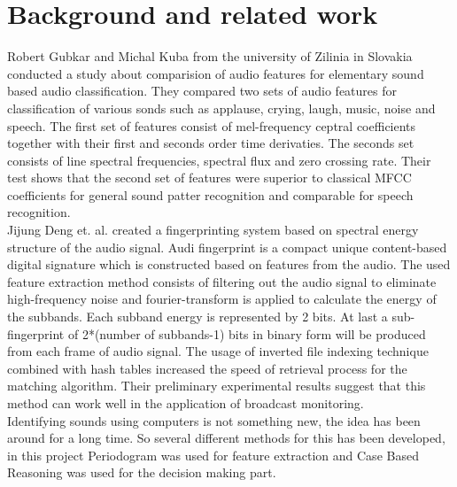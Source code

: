 \section{Background and related work}
Robert Gubkar and Michal Kuba \cite{6566278}  from the university of Zilinia in Slovakia
conducted a study about comparision of audio features for elementary sound
based audio classification. They compared two sets of audio features for classification
of various sonds such as applause, crying, laugh, music, noise and speech.
The first set of features consist of mel-frequency ceptral coefficients together with
their first and seconds order time derivaties. The seconds set consists of line
spectral frequencies, spectral flux and zero crossing rate. Their test shows that
the second set of features were superior to classical MFCC coefficients for general
sound patter recognition and comparable for speech recognition.\\

Jijung Deng et. al.\cite{6138136} created a fingerprinting system based on spectral energy
structure of the audio signal. Audi fingerprint is a compact unique content-based
digital signature which is constructed based on features from the audio.
The used feature extraction method consists of filtering out the audio signal
to eliminate high-frequency noise and fourier-transform is applied to calculate
the energy of the subbands. Each subband energy is represented by 2 bits.
At last a sub-fingerprint of 2*(number of subbands-1) bits in binary form will
be produced from each frame of audio signal. The usage of inverted file
indexing technique combined with hash tables increased the speed of retrieval
process for the matching algorithm. Their preliminary experimental results
suggest that this method can work well in the application of broadcast
monitoring.\\


Identifying sounds using computers is not something new, the idea has been
around for a long time. So several different methods for this has been
developed, in this project Periodogram was used for feature extraction and
Case Based Reasoning was used for the decision making part.\\

